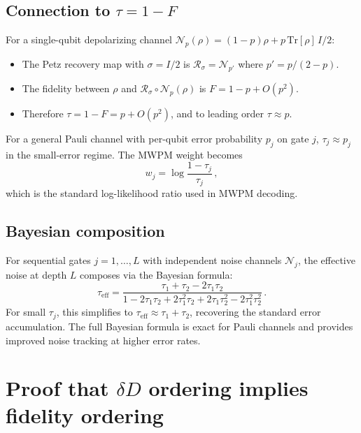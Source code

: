 \documentclass[12pt]{article}
\newcommand{\Tr}{\mathrm{Tr}}
\newcommand{\Petz}{\mathcal{R}}
\newcommand{\chan}{\mathcal{N}}
\newcommand{\dd}{\delta\!D}
\begin{document}
\subsection{Connection to $\tau = 1 - F$}

For a single-qubit depolarizing channel $\chan_p(\rho) = (1-p)\rho + p\,\Tr[\rho]\,I/2$:
\begin{itemize}
  \item The Petz recovery map with $\sigma = I/2$ is $\Petz_{\sigma} = \chan_{p'}$ where $p' = p/(2-p)$.
  \item The fidelity between $\rho$ and $\Petz_\sigma \circ \chan_p(\rho)$ is $F = 1 - p + O(p^2)$.
  \item Therefore $\tau = 1 - F = p + O(p^2)$, and to leading order $\tau \approx p$.
\end{itemize}

For a general Pauli channel with per-qubit error probability $p_j$ on gate $j$, $\tau_j \approx p_j$ in the small-error regime. The MWPM weight becomes
\begin{equation}
  w_j = \log\frac{1-\tau_j}{\tau_j}\,,
\end{equation}
which is the standard log-likelihood ratio used in MWPM decoding.

\subsection{Bayesian composition}

For sequential gates $j = 1, \ldots, L$ with independent noise channels $\chan_j$, the effective noise at depth $L$ composes via the Bayesian formula:
\begin{equation}
  \tau_{\text{eff}} = \frac{\tau_1 + \tau_2 - 2\tau_1\tau_2}{1 - 2\tau_1\tau_2 + 2\tau_1^2\tau_2 + 2\tau_1\tau_2^2 - 2\tau_1^2\tau_2^2}\,.
\end{equation}
For small $\tau_j$, this simplifies to $\tau_{\text{eff}} \approx \tau_1 + \tau_2$, recovering the standard error accumulation. The full Bayesian formula is exact for Pauli channels and provides improved noise tracking at higher error rates.

\section{Proof that $\dd$ ordering implies fidelity ordering}
\label{sec:ordering}
\end{document}
